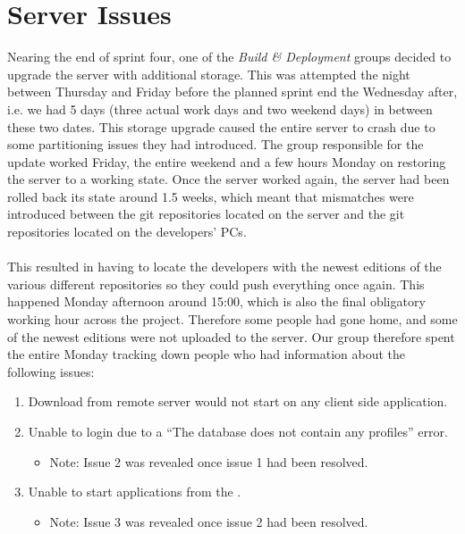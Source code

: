
\section{Server Issues}
\label{sec:server_issues}

Nearing the end of sprint four, one of the \emph{Build \& Deployment} groups decided to upgrade the server with additional storage. This was attempted the night between Thursday and Friday before the planned sprint end the Wednesday after, i.e. we had 5 days (three actual work days and two weekend days) in between these two dates. This storage upgrade caused the entire server to crash due to some partitioning issues they had introduced. The group responsible for the update worked Friday, the entire weekend and a few hours Monday on restoring the server to a working state. Once the server worked again, the server had been rolled back its state around 1.5 weeks, which meant that mismatches were introduced between the git repositories located on the server and the git repositories located on the developers' PCs. 
\\\\
This resulted in having to locate the developers with the newest editions of the various different repositories so they could push everything once again. This happened Monday afternoon around 15:00, which is also the final obligatory working hour across the project. Therefore some people had gone home, and some of the newest editions were not uploaded to the server. Our group therefore spent the entire Monday tracking down people who had information about the following issues:

\begin{enumerate}
    \item Download from remote server would not start on any client side application.
    \item Unable to login due to a ``The database does not contain any profiles'' error.
    \begin{itemize}
        \item Note: Issue 2 was revealed once issue 1 had been resolved.
    \end{itemize}
    \item Unable to start applications from the \launcher.   
    \begin{itemize}
        \item Note: Issue 3 was revealed once issue 2 had been resolved. 
    \end{itemize}
\end{enumerate}

